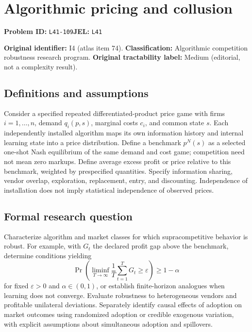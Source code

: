 \documentclass[11pt,a4paper]{article}
\begin{document}
\section*{Algorithmic pricing and collusion}
\textbf{Problem ID:} \texttt{L41-109}\quad \textbf{JEL:} \texttt{L41}\par
\label{problem:OP-0074}
\label{atlas:prob:I4}

\noindent\textbf{Original identifier:} I4 (atlas item 74). \textbf{Classification:} Algorithmic competition robustness research program. \textbf{Original tractability label:} Medium (editorial, not a complexity result).

\subsection*{Definitions and assumptions}

Consider a specified repeated differentiated-product price game with firms $i=1,\ldots,n$, demand $q_i(p,s)$, marginal costs $c_i$, and common state $s$. Each independently installed algorithm maps its own information history and internal learning state into a price distribution. Define a benchmark $p^N(s)$ as a selected one-shot Nash equilibrium of the same demand and cost game; competition need not mean zero markups. Define average excess profit or price relative to this benchmark, weighted by prespecified quantities. Specify information sharing, vendor overlap, exploration, replacement, entry, and discounting. Independence of installation does not imply statistical independence of observed prices.

\subsection*{Formal research question}

Characterize algorithm and market classes for which supracompetitive behavior is robust. For example, with $G_t$ the declared profit gap above the benchmark, determine conditions yielding
\[
\Pr\!\left(\liminf_{T\to\infty}\frac1T\sum_{t=1}^TG_t\geq\varepsilon\right)\geq1-\alpha
\]
for fixed $\varepsilon>0$ and $\alpha\in(0,1)$, or establish finite-horizon analogues when learning does not converge. Evaluate robustness to heterogeneous vendors and profitable unilateral deviations. Separately identify causal effects of adoption on market outcomes using randomized adoption or credible exogenous variation, with explicit assumptions about simultaneous adoption and spillovers.
\end{document}
